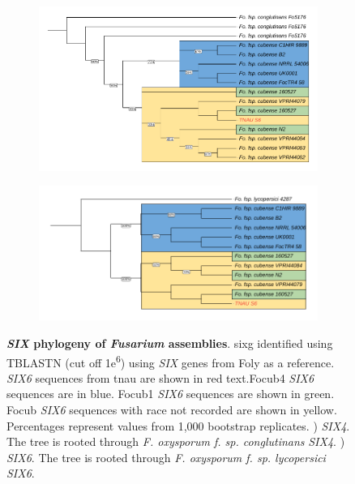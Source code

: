 \begin{figure}[hp!]
\centering
    \begin{subfigure}[]{0.9\textwidth}
        \centering
        \includegraphics[width=\textwidth]{Figures/FusSIX4.phylo.pdf}
        \caption{}
        \label{fig:FusSIX4.phylo}
    \end{subfigure}
        \begin{subfigure}[]{0.9\textwidth}
        \centering
        \includegraphics[width=\textwidth]{Figures/FusSIX6.phylo.pdf}
        \caption{}
        \label{fig:FusSIX6.phylo}
    \end{subfigure}
    \caption[\textit{SIX}6 gene phylogeny of \textit{Fusarium} assemblies]{\textbf{\textit{SIX} phylogeny of \textit{Fusarium} assemblies}.
    \acl{sixg} identified using TBLASTN (cut off 1\-e\textsuperscript{6}) using \textit{SIX} genes from \acl{Foly} as a reference. \textit{SIX6} sequences from \ac{tnau} are shown in red text.\Acl{Focub4} \textit{SIX6} sequences are in blue. \Acl{Focub1} \textit{SIX6} sequences are shown in green. \acl{Focub} \textit{SIX6} sequences with race not recorded are shown in yellow. Percentages represent values from 1,000 bootstrap replicates. ) \textit{SIX4}. The tree is rooted through \textit{F. oxysporum f. sp. conglutinans} \textit{SIX4}. ) \textit{SIX6}. The tree is rooted through \textit{F. oxysporum f. sp. lycopersici} \textit{SIX6}.}
    \label{fig:FusSIXMultiPhylo}
\end{figure}

